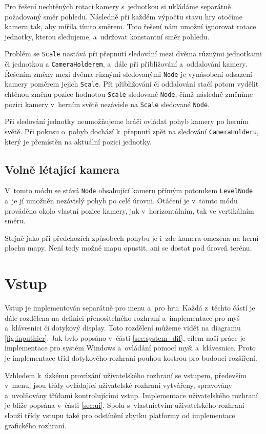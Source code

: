 Pro řešení nechtěných rotací kamery s~jednotkou si ukládáme separátně požadovaný směr pohledu. Následně při každém výpočtu stavu hry otočíme kameru tak, aby mířila tímto směrem. Toto řešení nám umožní ignorovat rotace jednotky, kterou sledujeme, a~udržovat konstantní směr pohledu. 

Problém se \texttt{Scale} nastává při přepnutí sledování mezi dvěma různými jednotkami či jednotkou a \texttt{CameraHolderem}, a~dále při přibližování a~oddalování kamery. Řešením změny mezi dvěma různými sledovanými \texttt{Node} je vynásobení odsazení kamery poměrem jejich \texttt{Scale}. Při přibližování či oddalování stačí potom vydělit chtěnou změnu pozice hodnotou \texttt{Scale} sledované \texttt{Node}, čímž následně změníme pozici kamery v~herním světě nezávisle na \texttt{Scale} sledované \texttt{Node}.

Při sledování jednotky neumožňujeme hráči ovládat pohyb kamery po herním světě. Při pokusu o~pohyb dochází k~přepnutí zpět na sledování \texttt{CameraHolderu}, který je přemístěn na aktuální pozici jednotky.

\subsection{Volně létající kamera}
V~tomto módu se stává \texttt{Node} obsahující kameru přímým potomkem \texttt{LevelNode} a~je jí umožněn nezávislý pohyb po celé úrovni. Otáčení je v~tomto módu prováděno okolo vlastní pozice kamery, jak v~horizontálním, tak ve vertikálním směru. 

Stejně jako při předchozích způsobech pohybu je i~zde kamera omezena na herní plochu mapy. Není tedy možné mapu opustit, ani se dostat pod úroveň terénu.

\section{Vstup}
\label{sec:input}
Vstup je implementován separátně pro menu a~pro hru. Každá z~těchto částí je dále rozdělena na definici přenositelného rozhraní a~implementace pro myš a~klávesnici či dotykový display. Toto rozdělení můžeme vidět na diagramu \ref{fig:inputhier}. Jak bylo popsáno v~části \ref{sec:system_dif}, cílem naší práce je implementace pro systém Windows a~ovládání pomocí myši a~klávesnice. Proto je implementace tříd dotykového rozhraní pouhou kostrou pro budoucí rozšíření. 

Vzhledem k~úzkému provázání uživatelského rozhraní se vstupem, především v~menu, jsou třídy ovládající uživatelské rozhraní vytvářeny, spravovány a~uvolňovány třídami kontrolujícími vstup. Implementace uživatelského rozhraní je blíže popsána v~části \ref{sec:ui}. Spolu s~vlastnictvím uživatelského rozhraní slouží třídy vstupu také pro odstínění zbytku platformy od implementace grafického rozhraní. 

